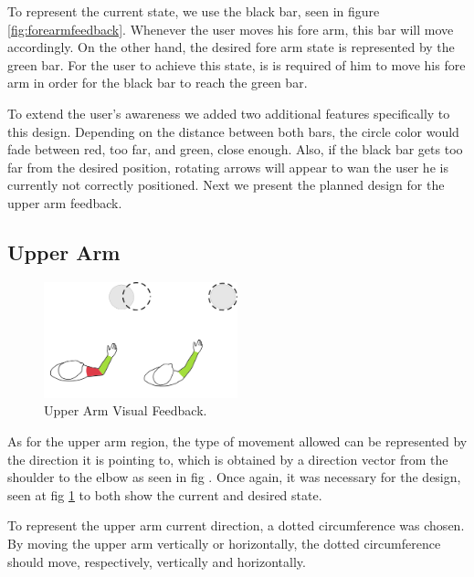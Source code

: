 To represent the current state, we use the black bar, seen in figure \ref{fig:forearmfeedback}. Whenever the user moves his fore arm, this bar will move accordingly.
On the other hand, the desired fore arm state is represented by the green bar. 
For the user to achieve this state, is is required of him to move his fore arm in order for the black bar to reach the green bar.

To extend the user's awareness we added two additional features specifically to this design. 
Depending on the distance between both bars, the circle color would fade between red, too far, and green, close enough. 
Also, if the black bar gets too far from the desired position, rotating arrows will appear to wan the user he is currently not correctly positioned. 
Next we present the planned design for the upper arm feedback.

\subsection{Upper Arm}

\begin{figure}[!t]
    \begin{center}
        \includegraphics[width=0.5\textwidth]{imgs/upperarmfeedback.png}
    \end{center}
    \caption{Upper Arm Visual Feedback.}
    \label{fig:upperarmfeedback}
\end{figure}

As for the upper arm region, the type of movement allowed can be represented by the direction it is pointing to, 
which is obtained by a direction vector from the shoulder to the elbow as seen in fig .
Once again, it was necessary for the design, seen at fig \ref{fig:upperarmfeedback} to both show the current and desired state. 


To represent the upper arm current direction, a dotted circumference was chosen. 
By moving the upper arm vertically or horizontally, the dotted circumference should move, respectively, vertically and horizontally.

